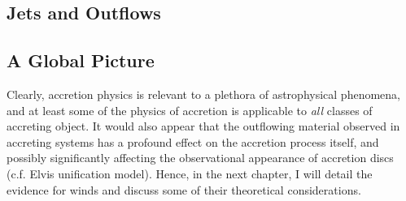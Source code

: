 \subsection{Jets and Outflows}


\subsection{A Global Picture}

Clearly, accretion physics is relevant to a plethora of astrophysical phenomena, 
and at least some of the physics of accretion is applicable to {\em all} 
classes of accreting object. 
It would also appear that the outflowing material observed in accreting systems 
has a profound effect on the accretion process itself, and 
possibly significantly affecting the observational 
appearance of accretion discs (c.f. Elvis unification model). 
Hence, in the next chapter, I will detail the evidence for
winds and discuss some of their theoretical considerations.

